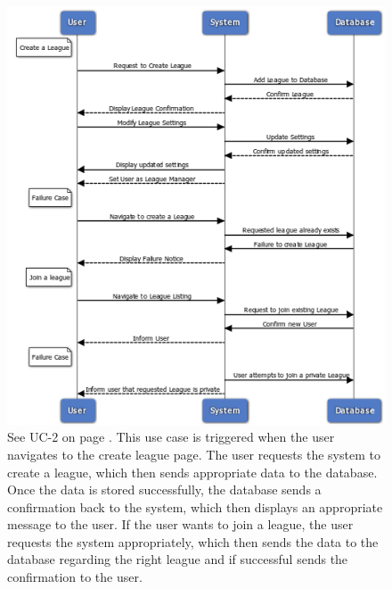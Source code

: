 \begin{figure}
\centering
\includegraphics[width=5.5in]{./img/uc2.png}
\caption{See UC-2 on page \pageref{UC-2}. This use case is triggered when the user navigates
to the create league page.
The user requests the system to create a league, which then sends appropriate
data to the database. Once the data is stored successfully, the database sends a
confirmation back to the system, which then displays an appropriate message to the
user. If the user wants to join a league, the user requests the system appropriately,
which then sends the data to the database regarding the right league and if
successful sends the confirmation to the user.}
\end{figure}

